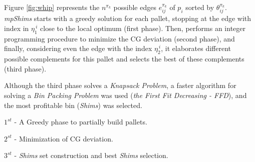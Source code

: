 \documentclass[preprint,authoryear]{elsarticle}
\begin{document}
Figure \ref{fig:whip} represents the $n^{\pi_k}$\/ possible edges $e_{ij}^{\pi_k}$\/ of $p_i$\/ sorted by $\theta_{ij}^{\pi_k}$. \emph{mpShims}\/ starts with a greedy solution for each pallet, stopping at the edge with index in $\eta_1^{\ i}$ close to the local optimum (first phase). Then, performs an integer programming procedure to minimize the CG deviation (second phase), and finally, considering even the edge with the index $\eta_2^{\ i}$, it elaborates different possible complements for this pallet and selects the best of these complements (third phase).

Although the third phase solves a {\it Knapsack Problem}, a faster algorithm for solving a {\it Bin Packing Problem} was used ({\it the First Fit Decreasing - FFD}), and the most profitable bin ({\it Shims}) was selected.
		
$1^{st}$ - A Greedy phase to partially build pallets.

$2^{st}$ - Minimization of CG deviation.

$3^{st}$ - {\it Shims} set construction and best {\it Shims} selection.
\end{document}
